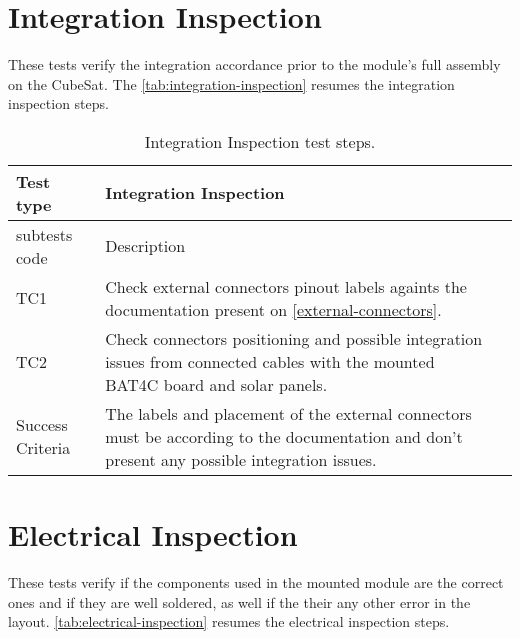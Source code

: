 \section{Integration Inspection}

These tests verify the integration accordance prior to the module's full assembly on the CubeSat. The \autoref{tab:integration-inspection} resumes the integration inspection steps. 

\begin{table}[!htb]
\centering
\caption{Integration Inspection test steps.}
\label{tab:integration-inspection}
\begin{tabular}{m{3cm} m{12cm} m{3cm}}
\toprule
Test type & Integration Inspection \\
\midrule
\midrule
subtests code & Description \\ 
\midrule
TC1 & Check external connectors pinout labels againts the documentation present on \autoref{external-connectors}. \\
\midrule
TC2 & Check connectors positioning and possible integration issues from connected cables with the mounted BAT4C board and solar panels. \\
\midrule
\midrule
Success Criteria & The labels and placement of the external connectors must be according to the documentation and don't present any possible integration issues. \\
\bottomrule
\end{tabular}
\end{table}

\section {Electrical Inspection}

These tests verify if the components used in the mounted module are the correct ones and if they are well soldered, as well if the their any other error in the layout. \autoref{tab:electrical-inspection} resumes the electrical inspection steps.

